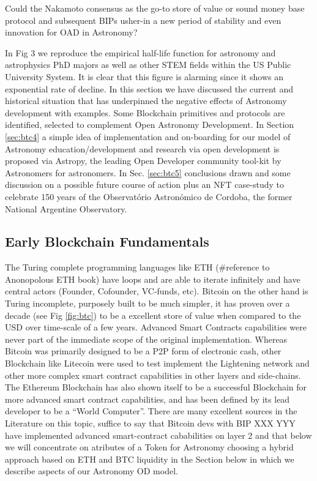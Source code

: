 \documentclass[final,5p,times,twocolumn,authoryear]{elsarticle}
\begin{document}
Could the Nakamoto consensus as the go-to store of value or sound money base protocol and subsequent BIPs usher-in a new period of stability and even innovation for OAD in Astronomy? 

In Fig 3 we reproduce the empirical half-life function for astronomy and astrophysics PhD majors as well as other STEM fields within the US Public University System. It is clear that this figure is alarming since it shows an exponential rate of decline.  In this section we have discussed the current and historical situation that has underpinned the negative effects of Astronomy development with examples. Some Blockchain primitives and protocols are identified, selected to complement Open Astronomy Development.  In Section \ref{sec:btc4} a simple idea of implementation and on-boarding for our model of Astronomy education/development and research via open development is proposed via Astropy, the leading Open Developer community tool-kit by Astronomers for astronomers. In Sec. \ref{sec:btc5} conclusions drawn and some discussion on a possible future course of action plus an NFT case-study to celebrate 150 years of the Observat\'orio Astron\'omico de Cordoba, the former National Argentine Observatory. 

\subsection{Early Blockchain Fundamentals}
\label{subsec:fundamentals}

The Turing complete programming languages like ETH (#reference to Anonopolous ETH book) have loops and are able to iterate infinitely and have central actors (Founder, Cofounder, VC-funds, etc). Bitcoin on the other hand is Turing incomplete, purposely built to be much simpler, it has proven over a decade (see Fig \ref{fig:btc}) to be a excellent store of value when compared to the USD over time-scale of a few years. Advanced Smart Contracts capabilities were never part of the immediate scope of the original implementation. Whereas Bitcoin was primarily designed to be a P2P form of electronic cash, other Blockchain like Litecoin were used to test implement the Lightening network and other more complex smart contract capabilities in other layers and side-chains. The Ethereum Blockchain has also shown itself to be a successful Blockchain for more advanced smart contract capabilities, and has been defined by its lead developer to be a “World Computer”. There are many excellent sources in the Literature on this topic, suffice to say that Bitcoin devs with BIP XXX YYY have implemented advanced smart-contract cababilities on layer 2 and that below we will concentrate on atributes of a Token for Astronomy choosing a hybrid approach based on ETH and BTC liquidity in the Section below in which we describe aspects of our Astronomy OD model.
 
\end{document}

